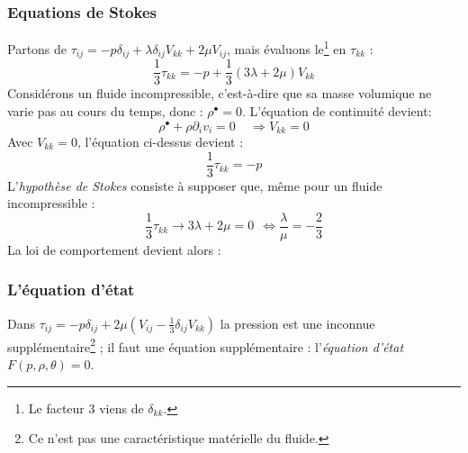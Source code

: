         \subsubsection{Equations de Stokes}
        Partons de $\tau_{ij} = -p\delta_{ij} + \lambda\delta_{ij}V_{kk} + 2\mu V_{ij}$, mais
        évaluons le\footnote{Le facteur 3 viens de $\delta_{kk}$.} en $\tau_{kk}$ :
        \begin{equation}
        \frac{1}{3}\tau_{kk} = -p + \frac{1}{3}(3\lambda + 2\mu)V_{kk}
        \end{equation}
        Considérons un fluide incompressible, c'est-à-dire que sa masse volumique ne varie
        pas au cours du temps, donc : $\rho^\bullet = 0$. L'équation de continuité devient:
        \begin{equation}
        \rho^\bullet + \rho \partial_i v_i = 0\ \ \ \ \ \Rightarrow V_{kk} = 0
        \end{equation}
        Avec $V_{kk} = 0$, l'équation ci-dessus devient :
        \begin{equation}
        \frac{1}{3}\tau_{kk} = -p
        \end{equation}
        L'\textit{hypothèse de Stokes} consiste à supposer que, même pour un fluide 
        incompressible :
        \begin{equation}
        \frac{1}{3}\tau_{kk} \rightarrow 3\lambda + 2\mu = 0\ \ \Leftrightarrow 
        \frac{\lambda}{\mu} = -\frac{2}{3}
        \end{equation}
        La loi de comportement devient alors :\\
        
        
        
        \subsubsection{L'équation d'état}
        Dans $\tau_{ij} = -p\delta_{ij} + 2\mu\left(V_{ij} - \frac{1}{3}\delta_{ij}V_{kk}
        \right)$ la pression est une inconnue supplémentaire\footnote{Ce n'est pas une
        caractéristique matérielle du fluide.} ; il faut une équation supplémentaire :
        l'\textit{équation d'état} $F(p,\rho,\theta) = 0$.\\
        
